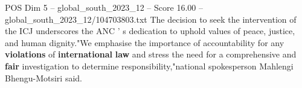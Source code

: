 \begin{textsample}{POS Dim 5 – global\_south\_2023\_12 – Score 16.00 – global\_south\_2023\_12/104703803.txt}
The decision to seek the intervention of the ICJ underscores the ANC ' s dedication to uphold values of peace, justice, and human dignity."We emphasise the importance of accountability for any \textbf{violations} of \textbf{international} \textbf{law} and stress the need for a comprehensive and \textbf{fair} investigation to determine responsibility,"national spokesperson Mahlengi Bhengu-Motsiri said.

\end{textsample}
